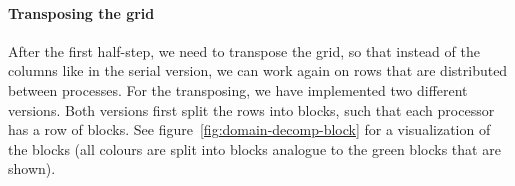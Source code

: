 \documentclass[a4paper]{article}
\begin{document}
\paragraph{Transposing the grid}\label{sec:transposing}
After the first half-step, we need to transpose the grid, so that instead of the columns like in the serial version, we can work again on rows that are distributed between processes.
For the transposing, we have implemented two different versions.
Both versions first split the rows into blocks, such that each processor has a row of blocks.
See figure~\ref{fig:domain-decomp-block} for a visualization of the blocks (all colours are split into blocks analogue to the green blocks that are shown).
\end{document}
